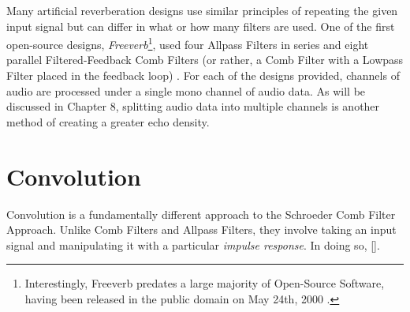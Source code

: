 Many artificial reverberation designs use similar principles of repeating the given input signal but can differ in what or how many filters are used. One of the first open-source designs, \textit{Freeverb}\footnote{Interestingly, Freeverb predates a large majority of Open-Source Software, having been released in the public domain on May 24th, 2000 \cite{freeverb}.}, used four Allpass Filters in series and eight parallel Filtered-Feedback Comb Filters (or rather, a Comb Filter with a Lowpass Filter placed in the feedback loop) \cite{PASPWEB2010}. For each of the designs provided, channels of audio are processed under a single mono channel of audio data. As will be discussed in Chapter 8, splitting audio data into multiple channels is another method of creating a greater echo density.

\section{Convolution}
Convolution is a fundamentally different approach to the Schroeder Comb Filter Approach. Unlike Comb Filters and Allpass Filters, they involve taking an input signal and manipulating it with a particular \textit{impulse response}. In doing so, [].
